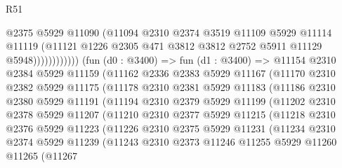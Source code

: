 \begin{lexlean}{R51}
\begin{coremodule}
                            @2375
                            @5929
                            @11090
                            (@11094
                              @2310
                              @2374
                              @3519
                              @11109
                              @5929
                              @11114
                              @11119
                              (@11121
                                @1226
                                @2305
                                @471
                                @3812
                                @3812
                                @2752
                                @5911
                                @11129
                                @5948))))))))))))
        (fun (d0 : @3400) =>
        fun (d1 : @3400) =>
        @11154
          @2310
          @2384
          @5929
          @11159
          (@11162
            @2336
            @2383
            @5929
            @11167
            (@11170
              @2310
              @2382
              @5929
              @11175
              (@11178
                @2310
                @2381
                @5929
                @11183
                (@11186
                  @2310
                  @2380
                  @5929
                  @11191
                  (@11194
                    @2310
                    @2379
                    @5929
                    @11199
                    (@11202
                      @2310
                      @2378
                      @5929
                      @11207
                      (@11210
                        @2310
                        @2377
                        @5929
                        @11215
                        (@11218
                          @2310
                          @2376
                          @5929
                          @11223
                          (@11226
                            @2310
                            @2375
                            @5929
                            @11231
                            (@11234
                              @2310
                              @2374
                              @5929
                              @11239
                              (@11243
                                @2310
                                @2373
                                @11246
                                @11255
                                @5929
                                @11260
                                @11265
                                (@11267

\end{coremodule}
\end{lexlean}
